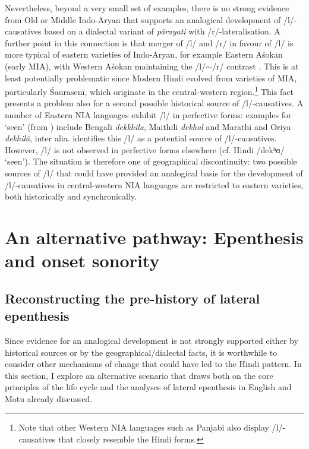 \documentclass[output=paper,colorlinks,citecolor=brown]{langscibook}
\begin{document}
Nevertheless, beyond a very small set of examples, there is no strong evidence from Old or Middle Indo\hyp Aryan that supports an analogical development of /l/\hyp causatives based on a dialectal variant of \textit{pārayati} with /r/\hyp lateralisation.  A further point in this connection is that merger of /l/ and /r/ in favour of /l/ is more typical of eastern varieties of Indo-Aryan, for example Eastern Aśokan (early MIA), with Western Aśokan maintaining the /l/$\sim$/r/ contrast \citep[176]{Oberlies2003}.  This is at least potentially problematic since Modern Hindi evolved from varieties of MIA, particularly Śaurasenī, which originate in the central-western region.\footnote{Note that other Western NIA languages such as Panjabi also display /l/-causatives that closely resemble the Hindi forms.}  This fact presents a problem also for a second possible historical source of /l/-causatives.  A number of Eastern NIA languages exhibit /l/ in perfective forms: examples for `seen' (from \citealt[267]{Bloch1965}) include Bengali \textit{dekkhila}, Maithili \textit{dekhal} and Marathi and Oriya \textit{dekhilā}, inter alia.  \citet{Bloch1965} identifies this /l/ as a potential source of /l/-causatives.  However, /l/ is not observed in perfective forms elsewhere (cf. Hindi /dekʰɑ/ `seen').  The situation is therefore one of geographical discontinuity: two possible sources of /l/ that could have provided an analogical basis for the development of /l/-causatives in central-western NIA languages are restricted to eastern varieties, both historically and synchronically.

\section{An alternative pathway: Epenthesis and onset sonority}\label{altern}
\subsection{Reconstructing the pre-history of lateral epenthesis}
Since evidence for an analogical development is not strongly supported either by historical sources or by the geographical/dialectal facts, it is worthwhile to consider other mechanisms of change that could have led to the Hindi pattern. In this section, I explore an alternative scenario that draws both on the core principles of the life cycle and the analyses of lateral epenthesis in English and Motu already discussed.
\end{document}
